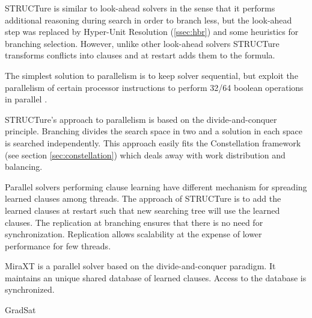STRUCTure is similar to look-ahead solvers in the sense that it
performs additional reasoning during search in order to branch less,
but the look-ahead step was replaced by Hyper-Unit Resolution
(\ref{ssec:hbr}) and some heuristics for branching selection.
However, unlike other look-ahead solvers STRUCTure transforms
conflicts into clauses and at restart adds them to the formula.

The simplest solution to parallelism is to keep solver
sequential, but exploit the parallelism of certain processor
instructions to perform 32/64 boolean operations in parallel
\cite{mine:heule_parallel}.

STRUCTure's approach to parallelism is based on the
divide-and-conquer principle. Branching divides the search space in
two and a solution in each space is searched independently. This
approach easily fits the Constellation framework (see section
\ref{sec:constellation}) which deals away with work
distribution and balancing.

Parallel solvers performing clause learning have different mechanism
for spreading learned clauses among threads. The approach of
STRUCTure is to add the learned clauses at restart such that
new searching tree will use the learned clauses. The replication
at branching ensures that there is no need for synchronization.
Replication allows scalability at the expense of lower performance
for few threads.

MiraXT \cite{mine:miraxt} is a parallel solver based on
the divide-and-conquer paradigm. It maintains an unique
shared database of learned clauses. Access to the database
is synchronized.


GradSat \cite{Chrabakh03gradsat:a}
